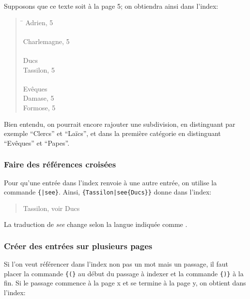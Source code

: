 Supposons que ce texte soit à la page 5; on obtiendra ainsi dans l'index:
\begin{quotation}
\begin{tabbing}
\hspace{0,5cm}  \= \kill
Adrien, 5 \\
\\
Charlemagne, 5 \\
\\
Ducs \\
\> Tassilon, 5\\
\\
Evêques \\
\> Damase, 5\\
\> Formose, 5\\

\end{tabbing}
\end{quotation}



Bien entendu, on pourrait encore rajouter une subdivision, en distinguant par exemple \enquote{Clercs} et \enquote{Laïcs}, et dans la première catégorie en distinguant \enquote{Evêques} et \enquote{Papes}. 


 
\subsubsection{Faire des références croisées}

Pour qu'une entrée dans l'index renvoie à une autre entrée, on utilise la commande  \verb|{|\verb+|see+\verb|}|. Ainsi,  \verb+{Tassilon|see{Ducs}}+ donne dans l'index:

\begin{quotation}
Tassilon, voir Ducs
\end{quotation}
La traduction de \emph{see} change selon la langue indiquée comme . 



  

\subsubsection{Créer des entrées sur plusieurs pages}

Si l'on veut référencer dans l'index non pas un mot mais un passage, il faut placer la commande \verb|{|\verb|(}| au début du passage à indexer et la commande  \verb|{|\verb|)}| à la fin. Si le passage commence à la page x et se termine à la page y, on obtient dans l'index: 

